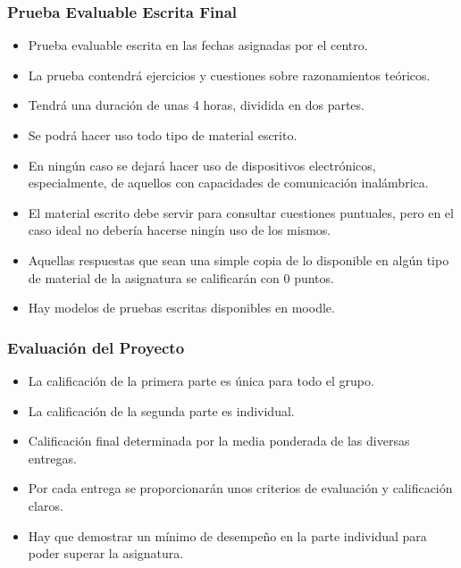 \documentclass[handout,a4paper,slidestop,xcolor=pst,dvips,blue]{beamer}
\begin{document}
\begin{frame}
	\frametitle{Prueba Evaluable Escrita Final}
	\begin{itemize}[<+->]
		\item Prueba evaluable escrita en las fechas asignadas por el centro.
		\item La prueba contendrá ejercicios y cuestiones sobre razonamientos teóricos.
		\item Tendrá una duración de unas 4 horas, dividida en dos partes.
        \item Se podrá hacer uso todo tipo de material escrito.
        \item En ningún caso se dejará hacer uso de dispositivos electrónicos, especialmente, de aquellos con capacidades de comunicación inalámbrica.
		\item \alert{El material escrito debe servir para consultar cuestiones puntuales, pero en el caso ideal no debería hacerse ningín uso de los mismos}.
		\item Aquellas respuestas que sean una simple copia de lo disponible en algún tipo de material de la asignatura se calificarán con 0 puntos.
        \item Hay modelos de pruebas escritas disponibles en moodle.
	\end{itemize}
\end{frame}

\begin{frame}[c]
	\frametitle{Evaluación del Proyecto}
	\begin{itemize}[<+->]
        \item La calificación de la primera parte es única para todo el grupo.
        \item La calificación de la segunda parte es individual.
        \item Calificación final determinada por la media ponderada de las diversas entregas.
        \item Por cada entrega se proporcionarán unos criterios de evaluación y calificación claros.
        \item Hay que demostrar un mínimo de desempeño en la parte individual para poder superar la asignatura.
	\end{itemize}
\end{frame}
\end{document}
